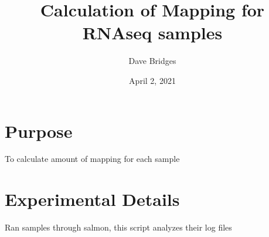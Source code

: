 \documentclass[]{article}
\title{Calculation of Mapping for RNAseq samples}
\author{Dave Bridges}
\date{April 2, 2021}
\begin{document}
\maketitle

{
\setcounter{tocdepth}{2}
\tableofcontents
}
\hypertarget{purpose}{%
\section{Purpose}\label{purpose}}

To calculate amount of mapping for each sample

\hypertarget{experimental-details}{%
\section{Experimental Details}\label{experimental-details}}

Ran samples through salmon, this script analyzes their log files
\end{document}
